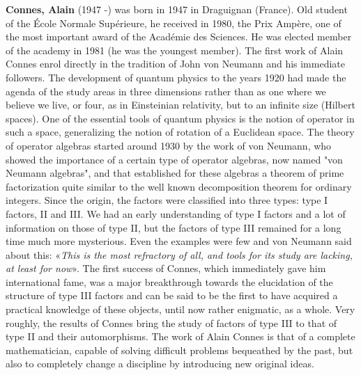 \textbf{Connes, Alain} (1947 -) was born in 1947 in Draguignan (France). Old student of the École Normale Supérieure, he received in 1980, the Prix Ampère, one of the most important award of the Académie des Sciences. He was elected member of the academy in 1981 (he was the youngest member). The first work of Alain Connes enrol directly in the tradition of John von Neumann and his immediate followers. The development of quantum physics to the years 1920 had made the agenda of the study areas in three dimensions rather than as one where we believe we live, or four, as in Einsteinian relativity, but to an infinite size (Hilbert spaces). One of the essential tools of quantum physics is the notion of operator in such a space, generalizing the notion of rotation of a Euclidean space. The theory of operator algebras started around 1930 by the work of von Neumann, who showed the importance of a certain type of operator algebras, now named "von Neumann algebras", and that established for these algebras a theorem of prime factorization quite similar to the well known decomposition theorem for ordinary integers. Since the origin, the factors were classified into three types: type I factors, II and III. We had an early understanding of type I factors and a lot of information on those of type II, but the factors of type III remained for a long time much more mysterious. Even the examples were few and von Neumann said about this: «\textit{This is the most refractory of all, and tools for its study are lacking, at least for now}». The first success of Connes, which immediately gave him international fame, was a major breakthrough towards the elucidation of the structure of type III factors and can be said to be the first to have acquired a practical knowledge of these objects, until now rather enigmatic, as a whole. Very roughly, the results of Connes bring the study of factors of type III to that of type II and their automorphisms. The work of Alain Connes is that of a complete mathematician, capable of solving difficult problems bequeathed by the past, but also to completely change a discipline by introducing new original ideas.


